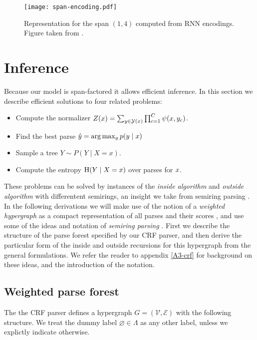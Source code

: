   \begin{figure}
    \texttt{[image: span-encoding.pdf]}
    \caption{Representation for the span $(1, 4)$ computed from RNN encodings. Figure taken from \citet{stern2018analyis}.}
    \label{fig:span-feature}
  \end{figure}

\section{Inference}
  \label{sect:inference}
  Because our model is span-factored it allows efficient inference. In this section we describe efficient solutions to four related problems:
  \begin{itemize}
    \item Compute the normalizer $Z(x) = \sum_{ y \in \mathcal{Y}(x) } \prod_{ c=1 }^{ C } \psi( x, y_c )$.
    \item Find the best parse $\hat{ y } = \arg \max_{y } p(y  \mid x)$
    \item Sample a tree $Y \sim P(Y \mid X = x)$.
    \item Compute the entropy $\operatorname{H}(Y \mid X = x)$ over parses for $x$.
  \end{itemize}
  These problems can be solved by instances of the \textit{inside algorithm} and \textit{outside algorithm} \citep{baker1979trainable} with differentent semirings, an insight we take from semiring parsing \citep{goodman1999semiring}. In the following derivations we will make use of the notion of a \textit{weighted hypergraph} as a compact representation of all parses and their scores \citep{gallo1993directed,klein2004parsing}, and use some of the ideas and notation of \textit{semiring parsing} \citep{goodman1999semiring,eisner2009semirings}. First we describe the structure of the parse forest specified by our CRF parser, and then derive the particular form of the inside and outside recursions for this hypergraph from the general formulations. We refer the reader to appendix \ref{A3-crf} for background on these ideas, and the introduction of the notation.

  \subsection{Weighted parse forest}
    The the CRF parser defines a hypergraph $G = (\mathcal{V}, \mathcal{E})$ with the following structure. We treat the dummy label $\varnothing \in \Lambda$ as any other label, unless we explictly indicate otherwise.


